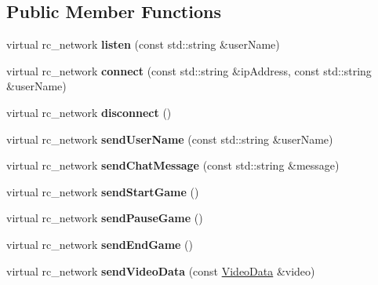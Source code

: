 \subsection*{Public Member Functions}
\begin{DoxyCompactItemize}
\item 
\hypertarget{classWinsockNetwork_a6f2f806a0e246a46ff6d0c2006cddd43}{
virtual rc\_\-network {\bfseries listen} (const std::string \&userName)}
\label{classWinsockNetwork_a6f2f806a0e246a46ff6d0c2006cddd43}

\item 
\hypertarget{classWinsockNetwork_a0f7f289635183b1082894f230a989006}{
virtual rc\_\-network {\bfseries connect} (const std::string \&ipAddress, const std::string \&userName)}
\label{classWinsockNetwork_a0f7f289635183b1082894f230a989006}

\item 
\hypertarget{classWinsockNetwork_abd947a2edb4d5053286f25b4c9f041c1}{
virtual rc\_\-network {\bfseries disconnect} ()}
\label{classWinsockNetwork_abd947a2edb4d5053286f25b4c9f041c1}

\item 
\hypertarget{classWinsockNetwork_ae76b6c306ef15d162fe652c38c78d4e2}{
virtual rc\_\-network {\bfseries sendUserName} (const std::string \&userName)}
\label{classWinsockNetwork_ae76b6c306ef15d162fe652c38c78d4e2}

\item 
\hypertarget{classWinsockNetwork_a420d4e6b5c698476a94dcdb503233de7}{
virtual rc\_\-network {\bfseries sendChatMessage} (const std::string \&message)}
\label{classWinsockNetwork_a420d4e6b5c698476a94dcdb503233de7}

\item 
\hypertarget{classWinsockNetwork_a20ed4411ec34336c6a213b15cc3fcad9}{
virtual rc\_\-network {\bfseries sendStartGame} ()}
\label{classWinsockNetwork_a20ed4411ec34336c6a213b15cc3fcad9}

\item 
\hypertarget{classWinsockNetwork_ae4412629d2ee052afc41c81f36cfad50}{
virtual rc\_\-network {\bfseries sendPauseGame} ()}
\label{classWinsockNetwork_ae4412629d2ee052afc41c81f36cfad50}

\item 
\hypertarget{classWinsockNetwork_a877c8001bbd880295e0458c3377dca25}{
virtual rc\_\-network {\bfseries sendEndGame} ()}
\label{classWinsockNetwork_a877c8001bbd880295e0458c3377dca25}

\item 
\hypertarget{classWinsockNetwork_a36362dbaa70fbe00dd48fded21464888}{
virtual rc\_\-network {\bfseries sendVideoData} (const \hyperlink{structVideoData}{VideoData} \&video)}
\label{classWinsockNetwork_a36362dbaa70fbe00dd48fded21464888}


\end{DoxyCompactItemize}
